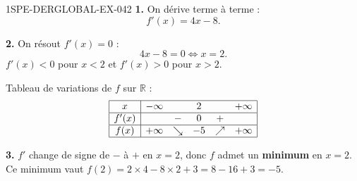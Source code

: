 \begin{corrige}{1SPE-DERGLOBAL-EX-042}
\textbf{1.} On dérive terme à terme :
\[
f'(x) = 4x - 8.
\]

\textbf{2.} On résout $f'(x) = 0$ :
\[
4x - 8 = 0 \iff x = 2.
\]
$f'(x) < 0$ pour $x < 2$ et $f'(x) > 0$ pour $x > 2$.

Tableau de variations de $f$ sur $\mathbb{R}$ :
\[
\begin{array}{|c|ccccc|}
\hline
x     & -\infty & & 2 & & +\infty \\
\hline
f'(x) &         & - & 0 & + & \\
\hline
f(x)  & +\infty & \searrow & -5 & \nearrow & +\infty \\
\hline
\end{array}
\]

\textbf{3.} $f'$ change de signe de $-$ à $+$ en $x = 2$, donc $f$ admet un \textbf{minimum} en $x = 2$.
Ce minimum vaut $f(2) = 2 \times 4 - 8 \times 2 + 3 = 8 - 16 + 3 = \boxed{-5}$.
\end{corrige}
